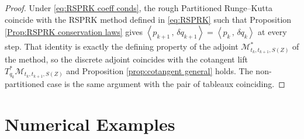 \documentclass[11pt, oneside]{article}
\numberwithin{equation}{section}
\newtheorem{proposition}[lemma]{Proposition}
\theoremstyle{definition}
\newcommand{\mc}[1]{\mathcal{#1}}
\newcommand{\mcal}[1]{\mc{#1}}
\newcommand{\scp}[2]{{\left\langle {#1}\, , \, {#2}\right\rangle}}
\begin{document}
\begin{proof}
    Under \eqref{eq:RSPRK coeff conds}, the rough Partitioned Runge--Kutta coincide with the RSPRK method defined in \eqref{eq:RSPRK} such that Proposition \ref{Prop:RSPRK conservation laws} gives $\scp{p_{k+1}}{\delta q_{k+1}} = \scp{p_k}{\delta q_k}$ at every step. That identity is exactly the defining property of the adjoint $\mcal{M}^*_{t_k, t_{k+1}, S(Z)}$ of the method, so the discrete adjoint coincides with the cotangent lift $T^*_{q_k}\mcal{M}_{t_k, t_{k+1}, S(Z)}$ and Proposition \ref{prop:cotangent general} holds. The non-partitioned case is the same argument with the pair of tableaux coinciding.
\end{proof}


\section{Numerical Examples}\label{sec:examples}
\end{document}

